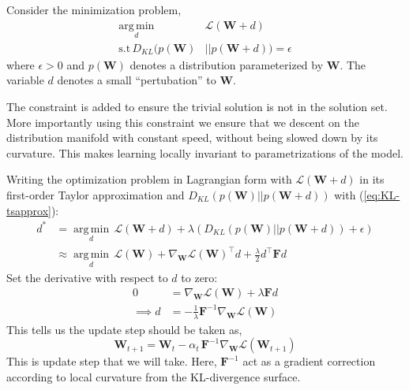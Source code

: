 \documentclass[10pt,twocolumn,letterpaper]{article}
\newcommand{\vect}[1]{\boldsymbol{\mathbf{#1}}}
\DeclareMathOperator*{\argmin}{arg\,min}
\begin{document}
Consider the minimization problem,
\begin{align*}
\underset{d}{\argmin} \, &\mathcal{L}(\vect{W} + d) \\
\mbox{s.t} \, D_{KL}(p(\vect{W}) &|| p(\vect{W}+d)) = \epsilon
\end{align*}
where \(\epsilon > 0\) and \(p(\vect{W})\) denotes a distribution parameterized by \(\vect{W}\). The variable \(d\) denotes a small ``pertubation'' to \(\vect{W}\). 

The constraint is added to ensure the trivial solution is not in the solution set. 
More importantly using this constraint we ensure that we descent on the distribution manifold with constant speed, without being slowed down by its curvature. 
This makes learning locally invariant to parametrizations of the model.

Writing the optimization problem in Lagrangian form with \(\mathcal{L}(\vect{W} + d)\) in its first-order Taylor approximation and \(D_{KL}(p(\vect{W}) || p(\vect{W}+d))\) with (\ref{eq:KL-tsapprox}):
\begin{align*}
    d^{*} &= \underset{d}{\argmin} \, \mathcal{L}(\vect{W} + d) + \lambda  (D_{KL}(p(\vect{W}) || p(\vect{W}+d)) + \epsilon) \\
    &\approx \underset{d}{\argmin} \, \mathcal{L}(\vect{W}) + \nabla_{\vect{W}} \mathcal{L}(\vect{W})^{\intercal}d + \frac{\lambda}{2}d^{\intercal}\vect{F}d
\end{align*}
Set the derivative with respect to \(d\) to zero:
\begin{align*}
    0 &= \nabla_{\vect{W}} \mathcal{L}(\vect{W}) + \lambda \vect{F}d \\
    \implies d &= -\frac{1}{\lambda} \vect{F}^{-1}\nabla_{\vect{W}} \mathcal{L}(\vect{W})
\end{align*}
This tells us the update step should be taken as,
\begin{equation}
    \vect{\vect{W}}_{t+1} = \vect{\vect{W}}_{t} - \alpha_t \, \vect{F}^{-1} \nabla_{\vect{W}} \mathcal{L}(\vect{W}_{t+1})
\end{equation}
This is update step that we will take. Here, \(\vect{F}^{-1}\) act as a gradient correction according to local curvature from the KL-divergence surface.

\end{document}
